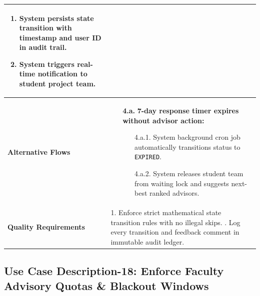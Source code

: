 \begin{table}[H]
\begin{tabularx}{\textwidth}{|l|X|}
\begin{enumerate}[leftmargin=*]
    \item System persists state transition with timestamp and user ID in audit trail.
    \item System triggers real-time notification to student project team.
\end{enumerate} \\ \hline
\textbf{Alternative Flows} &
\begin{itemize}[leftmargin=*]
    \item[\textbf{4.a.}] \textbf{7-day response timer expires without advisor action:}
    \begin{itemize}[leftmargin=*]
        \item[4.a.1.] System background cron job automatically transitions status to \texttt{EXPIRED}.
        \item[4.a.2.] System releases student team from waiting lock and suggests next-best ranked advisors.
    \end{itemize}
\end{itemize} \\ \hline
\textbf{Quality Requirements} & 
1. Enforce strict mathematical state transition rules with no illegal skips. \newline
2. Log every transition and feedback comment in immutable audit ledger. \\ \hline
\end{tabularx}
\end{table}

\clearpage
\subsection{Use Case Description-18: Enforce Faculty Advisory Quotas \& Blackout Windows}
\label{subsec:uc18}

